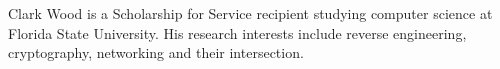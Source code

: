 \documentclass[11pt,expanded,copyright]{fsuthesis}
\begin{document}
%
%

%





% 
% 

\begin{biosketch}
Clark Wood is a Scholarship for Service recipient studying computer science at Florida State University. His research interests include reverse engineering, cryptography, networking and their intersection.
\end{biosketch}
\end{document}
